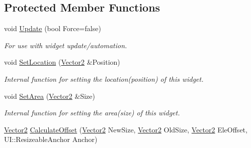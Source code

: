 \subsection*{Protected Member Functions}
\begin{DoxyCompactItemize}
\item 
\hypertarget{classphys_1_1UI_1_1Window_a867bbe36b9eb74e9fb306303258be5a4}{
void \hyperlink{classphys_1_1UI_1_1Window_a867bbe36b9eb74e9fb306303258be5a4}{Update} (bool Force=false)}
\label{d4/d86/classphys_1_1UI_1_1Window_a867bbe36b9eb74e9fb306303258be5a4}

\begin{DoxyCompactList}\small\item\em For use with widget update/automation. \item\end{DoxyCompactList}\item 
\hypertarget{classphys_1_1UI_1_1Window_ac6d3747e32b21e71d12f5b32568cc74c}{
void \hyperlink{classphys_1_1UI_1_1Window_ac6d3747e32b21e71d12f5b32568cc74c}{SetLocation} (\hyperlink{classphys_1_1Vector2}{Vector2} \&Position)}
\label{d4/d86/classphys_1_1UI_1_1Window_ac6d3747e32b21e71d12f5b32568cc74c}

\begin{DoxyCompactList}\small\item\em Internal function for setting the location(position) of this widget. \item\end{DoxyCompactList}\item 
\hypertarget{classphys_1_1UI_1_1Window_ae3fc6f6c92250fc9a563de93ecffa6e1}{
void \hyperlink{classphys_1_1UI_1_1Window_ae3fc6f6c92250fc9a563de93ecffa6e1}{SetArea} (\hyperlink{classphys_1_1Vector2}{Vector2} \&Size)}
\label{d4/d86/classphys_1_1UI_1_1Window_ae3fc6f6c92250fc9a563de93ecffa6e1}

\begin{DoxyCompactList}\small\item\em Internal function for setting the area(size) of this widget. \item\end{DoxyCompactList}\item 
\hypertarget{classphys_1_1UI_1_1Window_aced8fdd2865324d01ab03afb71235f61}{
\hyperlink{classphys_1_1Vector2}{Vector2} \hyperlink{classphys_1_1UI_1_1Window_aced8fdd2865324d01ab03afb71235f61}{CalculateOffset} (\hyperlink{classphys_1_1Vector2}{Vector2} NewSize, \hyperlink{classphys_1_1Vector2}{Vector2} OldSize, \hyperlink{classphys_1_1Vector2}{Vector2} EleOffset, UI::ResizeableAnchor Anchor)}
\label{d4/d86/classphys_1_1UI_1_1Window_aced8fdd2865324d01ab03afb71235f61}


\end{DoxyCompactItemize}
